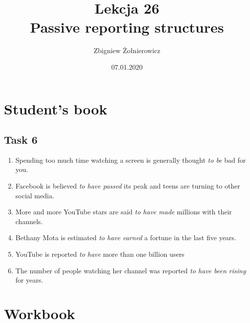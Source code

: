 \documentclass[a4paper]{article}
\begin{document}
\title{{\huge Lekcja 26} \\
{\large Passive reporting structures}}
\author{Zbigniew Żołnierowicz}
\date{07.01.2020}
\maketitle
\section{Student's book}
\subsection{Task 6}
\begin{enumerate}
    \item Spending too much time watching a screen is generally thought \emph{to be} bad for you.
    \item Facebook is believed \emph{to have passed} its peak and teens are turning to other social media.
    \item More and more YouTube stars are said \emph{to have made} millions with their channels.
    \item Bethany Mota is estimated \emph{to have earned} a fortune in the last five years.
    \item YouTube is reported \emph{to have} more than one billion users
    \item The number of people watching her channel was reported \emph{to have been rising} for years.
\end{enumerate}
\section{Workbook}
\end{document}
